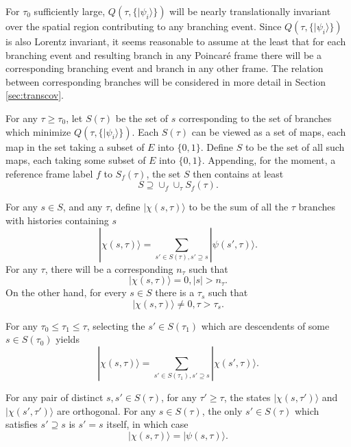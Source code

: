 \documentclass[twocolumn,amsmath,amssymb]{revtex4-1}
\begin{document}
For $\tau_0$ sufficiently large, $Q(\tau, \{|\psi_i \rangle \})$
will be nearly translationally invariant over the spatial
region contributing to any branching event.
Since $Q(\tau, \{|\psi_i \rangle \})$ is also Lorentz
invariant, it seems reasonable to assume at the least
that for each
branching event and resulting branch in any Poincar\'{e}
frame there will be a corresponding branching event
and branch in any other frame.
The relation between corresponding branches
will be considered in more detail in Section \ref{sec:transcov}.


For any $\tau \ge \tau_0$, let $S(\tau)$
be the set of $s$ corresponding to
the set of branches
which minimize $Q(\tau, \{|\psi_i \rangle \})$.
Each $S(\tau)$ can be viewed as a
set of maps, each map in the set taking a subset of $E$ into
$\{0,1\}$.
Define $S$ to be the set of all such 
maps, each taking some subset of
$E$ into $\{ 0, 1\}$. Appending, for the moment,
a reference frame label $f$ to
$S_f( \tau)$, the set $S$ then contains at least
\begin{equation}
  \label{lowerboundons}
  S \supseteq \cup_f \cup_{\tau} S_f( \tau).
  \end{equation}


For any $s \in S$, and any $\tau$,
define $|\chi( s, \tau) \rangle $ to be the sum of all the
$\tau$ branches with histories containing $s$
\begin{equation}
  \label{defhatchi}
  |\chi(s, \tau) \rangle  = \sum_{s' \in S(\tau), s' \supseteq s}| \psi( s', \tau) \rangle .
\end{equation}
For any $\tau$, there will be a corresponding $n_\tau$ such that
\begin{equation}
  \label{defnt}
  |\chi( s, \tau) \rangle  = 0, |s| > n_\tau.
\end{equation}
On the other hand, for every $s \in S$ there is a $\tau_s$ such that
\begin{equation}
  \label{defnt1}
  |\chi( s, \tau) \rangle  \ne 0, \tau > {\tau}_s.
\end{equation}

For any $\tau_0 \le \tau_1 \le \tau$,  
selecting the $s' \in S( \tau_1)$ which are descendents of
some $s \in S( \tau_0)$ yields 
\begin{equation}
  \label{defhatchi1}
  |\chi(s, \tau) \rangle  = \sum_{s' \in S(\tau_1), s' \supseteq s}| \chi( s', \tau) \rangle .
\end{equation}

For any pair of distinct $s, s' \in S( \tau)$, for any $\tau' \ge \tau$,
the states $|\chi( s, \tau') \rangle $
and $|\chi( s', \tau') \rangle $ are orthogonal.
For any $s \in S(\tau)$, the only $s' \in S(\tau)$
which satisfies $s' \supseteq s$ is $s' = s$ itself, in
which case
\begin{equation}
  \label{trivialcase}
  |\chi(s, \tau) \rangle  = |\psi(s, \tau) \rangle .
\end{equation}
\end{document}
